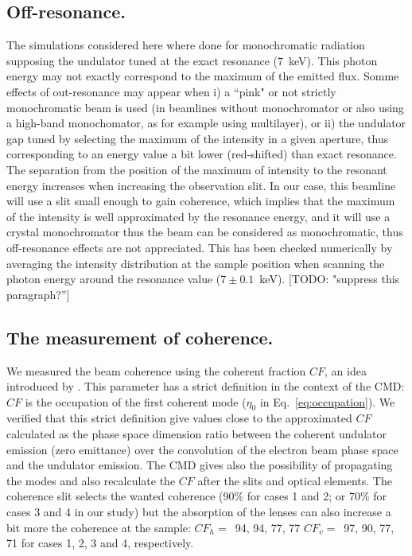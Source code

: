 \documentclass{iucr}              %
\newcommand{\todo}[1]{{\color{red}[TODO: "#1'']}}
\begin{document}
\subsection{Off-resonance.} The simulations considered here where done for monochromatic radiation supposing the undulator tuned at the exact resonance (\SI{7}{keV}). This photon energy may not exactly correspond to the maximum of the emitted flux. Somme effects of out-resonance may appear when i) a ``pink" or not strictly monochromatic beam is used (in beamlines without monochromator or also using a high-band monochomator, as for example using multilayer), or ii) the undulator gap tuned by selecting the maximum of the intensity in a given aperture, thus corresponding to an energy value a bit lower (red-shifted) than exact resonance. The separation from the position of the maximum of intensity to the resonant energy increases when increasing the observation slit. In our case, this beamline will use a slit small enough to gain coherence, which implies that the maximum of the intensity is well approximated by the resonance energy, and it will use a crystal monochromator thus the beam can be considered as monochromatic, thus off-resonance effects are not appreciated. This has been checked numerically by averaging the intensity distribution at the sample position when scanning the photon energy around the resonance value ($7\pm0.1$~keV).   \todo{suppress this paragraph?}


\subsection{The measurement of coherence.} We measured the beam coherence using the coherent fraction $CF$, an idea introduced by . This parameter has a strict definition in the context of the CMD: $CF$ is the occupation of the first coherent mode ($\eta_0$ in Eq.~\ref{eq:occupation}). We verified that this strict definition give values close to the approximated $CF$ calculated as the phase space dimension ratio between the coherent undulator emission (zero emittance) over the convolution of the electron beam phase space and the undulator emission. The CMD gives also the possibility of propagating the modes and also recalculate the $CF$ after the slits and optical elements. The coherence slit selects the wanted coherence (90\% for cases 1 and 2; or 70\% for cases 3 and 4 in our study) but the absorption of the lenses can also increase a bit more the coherence at the sample: $CF_h=$~94, 94, 77, 77 $CF_v=$~97, 90, 77, 71 for cases 1, 2, 3 and 4, respectively. 
\end{document}
